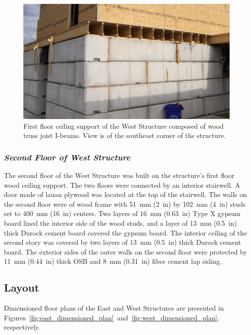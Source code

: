\begin{figure}[!h]
	\centering
	\includegraphics[width=0.9\columnwidth]{Figures/Pictures/TJI_support}
	\caption[Ceiling support of the West Structure]{First floor ceiling support of the West Structure composed of wood truss joist I-beams. View is of the southeast corner of the structure.}
	\label{fig:TJI}
\end{figure}
\FloatBarrier

\subsubsection*{\textit{Second Floor of West Structure}}
The second floor of the West Structure was built on the structure's first floor wood ceiling support. The two floors were connected by an interior stairwell. A door made of lauan plywood was located at the top of the stairwell. The walls on the second floor were of wood frame with 51~mm (2~in) by 102~mm (4~in) studs set to 400~mm (16~in) centers. Two layers of 16~mm (0.63~in) Type X gypsum board lined the interior side of the wood studs, and a layer of 13~mm (0.5~in) thick Durock cement board covered the gypsum board. The interior ceiling of the second story was covered by two layers of 13~mm (0.5~in) thick Durock cement board. The exterior sides of the outer walls on the second floor were protected by 11~mm (0.44~in) thick OSB and 8~mm (0.31~in) fiber cement lap siding.

\subsection{Layout}
Dimensioned floor plans of the East and West Structures are presented in Figures~\ref{fig:east_dimensioned_plan}~and~\ref{fig:west_dimensioned_plan}, respectively.

